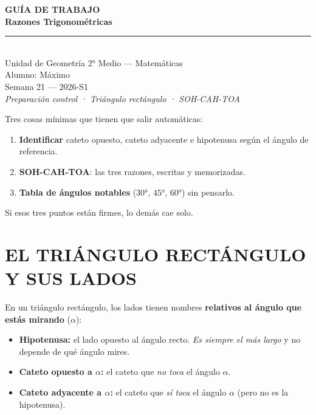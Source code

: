 \documentclass[11pt,a4paper]{article}
\newcommand{\guiaTitulo}{Razones Trigonométricas}
\newcommand{\guiaSubtitulo}{Preparación control · Triángulo rectángulo · SOH-CAH-TOA}
\newcommand{\guiaUnidad}{Unidad de Geometría}
\newcommand{\guiaCurso}{2° Medio --- Matemáticas}
\newcommand{\guiaAlumno}{Máximo}
\newcommand{\guiaSemana}{Semana 21}
\newcommand{\guiaSemestre}{2026-S1}
\begin{document}
\thispagestyle{empty}
\vspace*{2.5cm}
\begin{center}
  {\Huge\bfseries\color{azulprincipal} GUÍA DE TRABAJO}\\[8pt]
  {\LARGE\bfseries\color{azuloscuro} \guiaTitulo}\\[15pt]
  {\color{azulprincipal}\rule{8cm}{2pt}}\\[15pt]
  {\Large \guiaUnidad{} \textbar{} \guiaCurso}\\[8pt]
  {\large Alumno: \guiaAlumno}\\[4pt]
  {\large \guiaSemana{} --- \guiaSemestre}\\[25pt]
  {\itshape\color{gray}
  \guiaSubtitulo}
\end{center}

\vspace{1.5cm}
\begin{tcolorbox}[recuerda, title={\color{black} PARA EL CONTROL DEL MIÉRCOLES 20-MAY}]
Tres cosas mínimas que tienen que salir automáticas:
\begin{enumerate}[nosep]
  \item \textbf{Identificar} cateto opuesto, cateto adyacente e hipotenusa según el ángulo de referencia.
  \item \textbf{SOH-CAH-TOA}: las tres razones, escritas y memorizadas.
  \item \textbf{Tabla de ángulos notables} ($30°$, $45°$, $60°$) sin pensarlo.
\end{enumerate}
Si esos tres puntos están firmes, lo demás cae solo.
\end{tcolorbox}

\newpage

\section{EL TRIÁNGULO RECTÁNGULO Y SUS LADOS}

\begin{tcolorbox}[definicion, title=Los tres lados]
En un triángulo rectángulo, los lados tienen nombres \textbf{relativos al ángulo que estás mirando} ($\alpha$):

\begin{itemize}[nosep]
  \item \textbf{Hipotenusa:} el lado opuesto al ángulo recto. \emph{Es siempre el más largo} y no depende de qué ángulo mires.
  \item \textbf{Cateto opuesto a $\alpha$:} el cateto que \emph{no toca} el ángulo $\alpha$.
  \item \textbf{Cateto adyacente a $\alpha$:} el cateto que \emph{sí toca} el ángulo $\alpha$ (pero no es la hipotenusa).
\end{itemize}
\end{tcolorbox}
\end{document}
